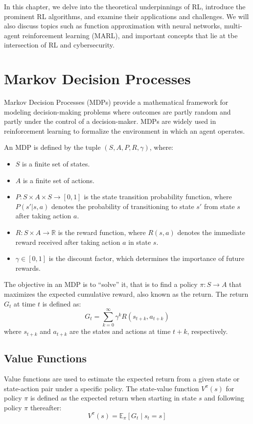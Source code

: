 In this chapter, we delve into the theoretical underpinnings of \gls{RL}, introduce the prominent \gls{RL} algorithms, and examine their applications and challenges.
We will also discuss topics such as function approximation with neural networks, multi-agent reinforcement learning (\gls{MARL}), and important concepts that lie at tbe intersection of \gls{RL} and cybersecurity.

\section{Markov Decision Processes}

Markov Decision Processes (MDPs) provide a mathematical framework for modeling decision-making problems where outcomes are partly random and partly under the control of a decision-maker.
MDPs are widely used in reinforcement learning to formalize the environment in which an agent operates.

An MDP is defined by the tuple $(S, A, P, R, \gamma)$, where:
\begin{itemize}
    \item $S$ is a finite set of states.
    \item $A$ is a finite set of actions.
    \item $P: S \times A \times S \rightarrow [0,1]$ is the state transition probability function, where $P(s'|s,a)$ denotes the probability of transitioning to state $s'$ from state $s$ after taking action $a$.
    \item $R: S \times A \rightarrow \mathbb{R}$ is the reward function, where $R(s,a)$ denotes the immediate reward received after taking action $a$ in state $s$.
    \item $\gamma \in [0,1]$ is the discount factor, which determines the importance of future rewards.
\end{itemize}

The objective in an MDP is to ``solve'' it, that is to find a policy $\pi: S \rightarrow A$ that maximizes the expected cumulative reward, also known as the return.
The return $G_t$ at time $t$ is defined as:
\[
G_t = \sum_{k=0}^{\infty} \gamma^k R(s_{t+k}, a_{t+k})
\]
where $s_{t+k}$ and $a_{t+k}$ are the states and actions at time $t+k$, respectively.

\subsection{Value Functions}

Value functions are used to estimate the expected return from a given state or state-action pair under a specific policy.
The state-value function $V^{\pi}(s)$ for policy $\pi$ is defined as the expected return when starting in state $s$ and following policy $\pi$ thereafter:
\[
V^{\pi}(s) = \mathbb{E}_{\pi} \left[ G_t \mid s_t = s \right]
\]


